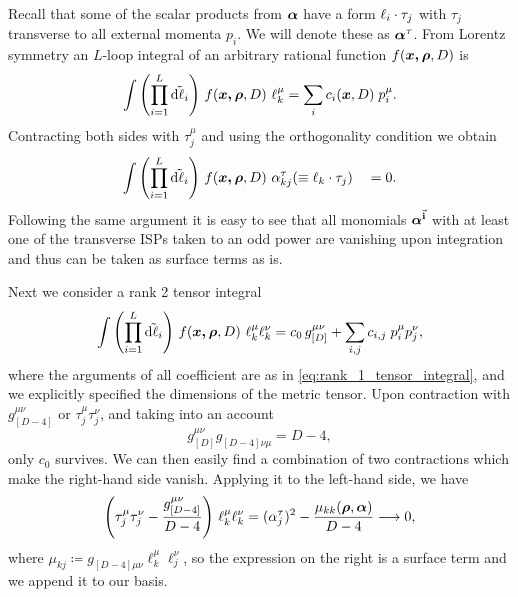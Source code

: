 Recall that some of the scalar products from $\vb*{\alpha}$ have a form $\sp(\ell_i,\tau_j)$ with $\tau_j$ transverse to all external momenta $p_i$.
We will denote these as $\vb*{\alpha}^\tau$.
From Lorentz symmetry an $L$-loop integral of an arbitrary rational function $f(\vb*{\vb*{x},\vb*{\rho}},D)$ is
\begin{equation} \label{eq:rank_1_tensor_integral}
  \int \qty(\prod_{i=1}^{L} \tilde{\dd{\ell_i}}){}~ f(\vb*{\vb*{x},\vb*{\rho}},D) ~ \ell_k^{\mu} = \sum_{i}^{}c_i(\vb*{x},D)\;p^\mu_i.
\end{equation}
Contracting both sides with $\tau^\mu_j$ and using the orthogonality condition we obtain
\begin{equation}
  \Dmeasure{}~ f(\vb*{\vb*{x},\vb*{\rho}},D) ~ \alpha^{\tau}_{k j}( \equiv \sp(\ell_k,\tau_j)) \quad = 0.
\end{equation}
Following the same argument it is easy to see that all monomials $\vb*{\alpha}^{\va{i}}$ with at least
one of the transverse ISPs taken to an odd power are vanishing upon integration and thus can be taken as surface terms as is.

Next we consider a rank 2 tensor integral
\begin{equation}
  \int \qty(\prod_{i=1}^{L} \tilde{\dd{\ell_i}}){}~ f(\vb*{\vb*{x},\vb*{\rho}},D) ~ \ell_k^{\mu}\ell_k^{\nu} = c_0\,g^{\mu\nu}_{[D]} + \sum_{i,j}^{}c_{i,j}\;p^\mu_i p^\nu_j,
\end{equation}
where the arguments of all coefficient are as in \cref{eq:rank_1_tensor_integral}, and we explicitly specified the dimensions of the metric tensor.
Upon contraction with $g^{\mu\nu}_{[D-4]}$ or $\tau_j^\mu\tau_j^\nu$, and taking into an account
\[
  g^{\mu\nu}_{[D]}g^{\phantom{\mu\nu}}_{[D-4]\nu\mu} = D-4,
\]
only $c_0$ survives.
We can then easily find a combination of two contractions which make the right-hand side vanish. Applying it to the left-hand side, we have
\begin{equation}
  \qty(\tau_j^\mu\tau_j^\nu - \frac{g^{\mu\nu}_{[D-4]}}{D-4}) ~ \ell_k^{\mu}\ell_k^{\nu} = (\alpha_j^\tau)^2 - \frac{\mu_{kk}(\vb*{\rho},\vb*{\alpha})}{D-4} \longrightarrow 0,
\end{equation}
where $\mu_{kj} \coloneqq g^{\phantom{\mu\nu}}_{[D-4]\mu\nu} \ell_k^\mu \ell_j^\nu$, so the expression on the right is a surface term and
we append it to our basis.

